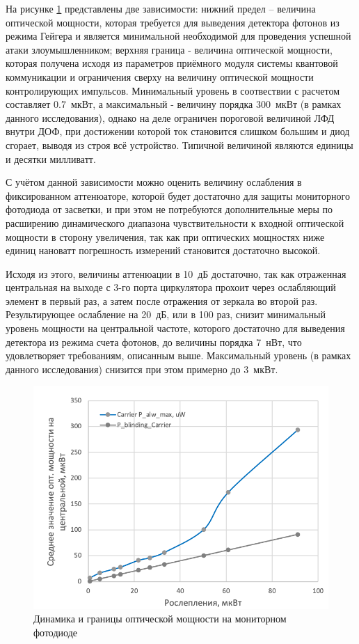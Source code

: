 На рисунке \ref{fig:Watchdog_photodiode} представлены две зависимости: нижний предел -- величина оптической мощности, которая требуется для выведения детектора фотонов из режима Гейгера и является минимальной необходимой для проведения успешной атаки злоумышленником; верхняя граница - величина оптической мощности, которая получена исходя из параметров приёмного модуля системы квантовой коммуникации и ограничения сверху на величину оптической мощности контролирующих импульсов. Минимальный уровень в соотвествии с расчетом составляет 0.7~мкВт, а максимальный - величину порядка 300~мкВт (в рамках данного исследования), однако на деле ограничен пороговой величиной ЛФД внутри ДОФ, при достижении которой ток становится слишком большим и диод сгорает, выводя из строя всё устройство. Типичной величиной являются единицы и десятки милливатт. 


С учётом данной зависимости можно оценить величину ослабления в фиксированном аттенюаторе, которой будет достаточно для защиты мониторного фотодиода от засветки, и при этом не потребуются дополнительные меры по расширению динамического диапазона чувствительности к входной оптической мощности в сторону увеличения, так как при оптических мощностях ниже единиц нановатт погрешность измерений становится достаточно высокой.   

Исходя из этого, величины аттенюации в 10~дБ достаточно, так как отраженная центральная на выходе с 3-го порта циркулятора прохоит через ослабляющий элемент в первый раз, а затем после отражения от зеркала во второй раз. Результирующее ослабление на 20~дБ, или в 100 раз, снизит минимальный уровень мощности на центральной частоте, которого достаточно для выведения детектора из режима счета фотонов, до величины порядка 7~нВт, что удовлетворяет требованиям, описанным выше. Максимальный уровень (в рамках данного исследования) снизится при этом примерно до 3~мкВт. 

 \begin{figure}[ht]
  \centering
  \includegraphics{images/Watchdog_photodiode.png}
  \caption{Динамика и границы оптической мощности на мониторном фотодиоде}
  \label{fig:Watchdog_photodiode}
\end{figure}


